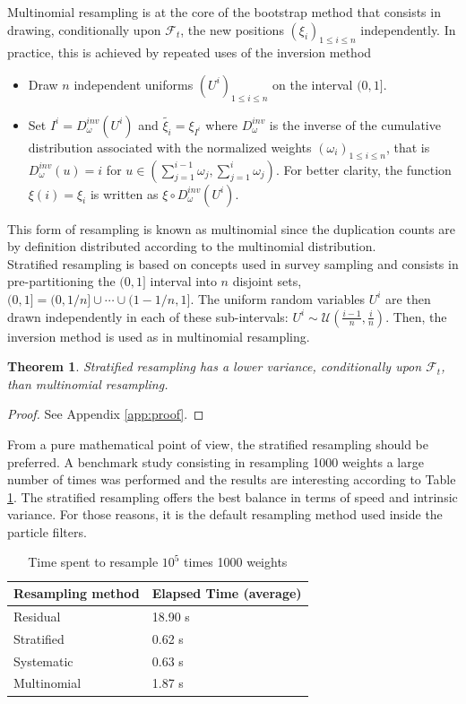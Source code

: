 \documentclass[11pt,a4,twosided,singlespacing,titlepagenumber=on]{scrreprt}
\numberwithin{equation}{chapter} %
\newtheorem{theorem}{Theorem}%
\theoremstyle{remark}
\begin{document}
Multinomial resampling is at the core of the bootstrap method that consists in drawing, conditionally upon $\mathcal{F}_t$, the new positions $\left( \xi_i \right)_{1 \leq i \leq n}$ independently. In practice, this is achieved by repeated uses of the inversion method
\begin{itemize}
\item Draw $n$ independent uniforms $(U^i)_{1 \leq i \leq n}$ on the interval $(0, 1]$.
\item Set $I^i = D_\omega^{inv}(U^i)$ and $\widetilde{\xi_i} = \xi_{I^i}$ where $D_\omega^{inv}$ is the inverse of the cumulative distribution associated with the normalized weights $\left( \omega_i \right)_{1 \leq i \leq n}$, that is $D_\omega^{inv}(u) = i$ for $u \in \left( \sum_{j=1}^{i-1} \omega_j, \sum_{j=1}^i \omega_j \right)$. For better clarity, the function $\xi(i) = \xi_i$ is written as $\xi \circ D_\omega^{inv}(U^i)$.
\end{itemize}
This form of resampling is known as multinomial since the duplication counts are by definition distributed according to the multinomial distribution. \\


Stratified resampling is based on concepts used in survey sampling and consists in pre-partitioning the $(0,1]$ interval into $n$ disjoint sets, $(0,1] = (0, 1/n] \cup \cdots \cup (1-1/n, 1]$. The uniform random variables $U^i$ are then drawn independently in each of these sub-intervals: $U^i \sim \mathcal{U}\left( \frac{i-1}{n}, \frac{i}{n} \right)$. Then, the inversion method is used as in multinomial resampling.

\begin{theorem}
\textit{
Stratified resampling has a lower variance, conditionally upon $\mathcal{F}_t$, than multinomial resampling.
}
\end{theorem}
\begin{proof}
See Appendix \ref{app:proof}.
\end{proof}

From a pure mathematical point of view, the stratified resampling should be preferred. A benchmark study consisting in resampling 1000 weights a large number of times was performed and the results are interesting according to Table \ref{resampling_method_table}. The stratified resampling offers the best balance in terms of speed and intrinsic variance. For those reasons, it is the default resampling method used inside the particle filters.

\begin{table}[H]
\centering
\begin{tabular}{ll}
\hline
\multicolumn{1}{|l|}{Resampling method}     & \multicolumn{1}{l|}{Elapsed Time (average)} \\ \hline
Residual 					   &  18.90 s \\
Stratified   				 &  0.62 s \\
Systematic   				 &  0.63 s \\
Multinomial          &  1.87 s \\
\hline
\end{tabular}
\caption{Time spent to resample $10^5$ times 1000 weights}
\label{resampling_method_table}
\end{table}
\end{document}
